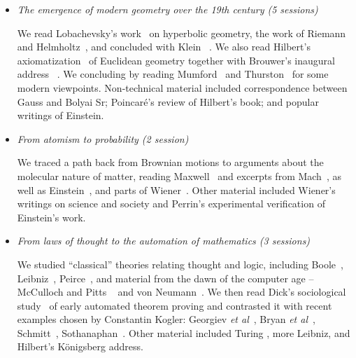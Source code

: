 \begin{itemize}

\item {\em The emergence of  modern geometry over the 19th century (5 sessions)\/}  

We read  Lobachevsky's work~\cite{lobachevsky_parallells}  on hyperbolic geometry,   the work of Riemann~\cite{riemann_hypothesen} and
Helmholtz~\cite{helmholtz_thatsachen,helmholtz_origin,helmholtz_origin_part2},    and concluded with Klein ~\cite{klein_nicht_euklidische,klein_erlangen}. We also read Hilbert's axiomatization~\cite{hilbert_grundlagen} of Euclidean geometry together with Brouwer's  inaugural address ~\cite{brouwer_intuitionism}.
We concluding by reading Mumford~\cite{mumford_stochasticity} and  Thurston~\cite{thurston_proof_progress,thurston_weeks_three_dimensional}
for some modern viewpoints. Non-technical material included
 correspondence between Gauss and Bolyai Sr;  Poincar{\'e}'s review of Hilbert's book;
and popular writings of Einstein.

\item {\em From atomism to probability (2 session) \/} 

We traced a path  back from Brownian motions to arguments about the molecular nature of matter, reading Maxwell~\cite{maxwell_molecules,maxwell_gases} and     
 excerpts from Mach~\cite{mach_mechanics},    as well as
Einstein~\cite{einstein_brownian},  and parts of Wiener~\cite{wiener_differential_space}.
Other material included 
 Wiener’s writings on science
  and society and Perrin’s experimental verification of Einstein’s work.

 
\item {\em From laws of thought to the automation of mathematics (3 sessions) \/}  

We studied  ``classical'' theories relating thought and logic, including
Boole~\cite{boole_laws}, Leibniz~\cite{leibniz_characteristic}, Peirce~\cite{peirce_algebra_writings}, 
and material from the dawn of the computer age --  McCulloch and Pitts ~\cite{mcculloch_pitts_calculus}
and von Neumann~\cite{vonneumann_mathematician,vonneumann_automata,vonneumann_computer_brain}.
We then read Dick's sociological study~\cite{dick_aftermath}  of early automated theorem proving   
and contrasted it with recent examples chosen by Constantin Kogler:   Georgiev {\em et al}~\cite{georgiev_mathematical}, Bryan {\em et al}~\cite{bryan_motivic}, Schmitt~\cite{schmitt_extremal}, Sothanaphan~\cite{sothanaphan_erdos}.  
Other material included Turing \cite{Turing}, more Leibniz, and Hilbert's K{\"o}nigsberg address.
 


\end{itemize}
